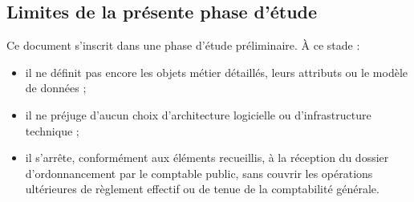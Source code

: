 \subsection{Limites de la présente phase d'étude}

Ce document s'inscrit dans une phase d'étude préliminaire. À ce stade :
\begin{itemize}
  \item il ne définit pas encore les objets métier détaillés, leurs attributs ou le modèle de données ;
  \item il ne préjuge d'aucun choix d'architecture logicielle ou d'infrastructure technique ;
  \item il s'arrête, conformément aux éléments recueillis, à la réception du dossier d'ordonnancement par le comptable public, sans couvrir les opérations ultérieures de règlement effectif ou de tenue de la comptabilité générale.
\end{itemize}
